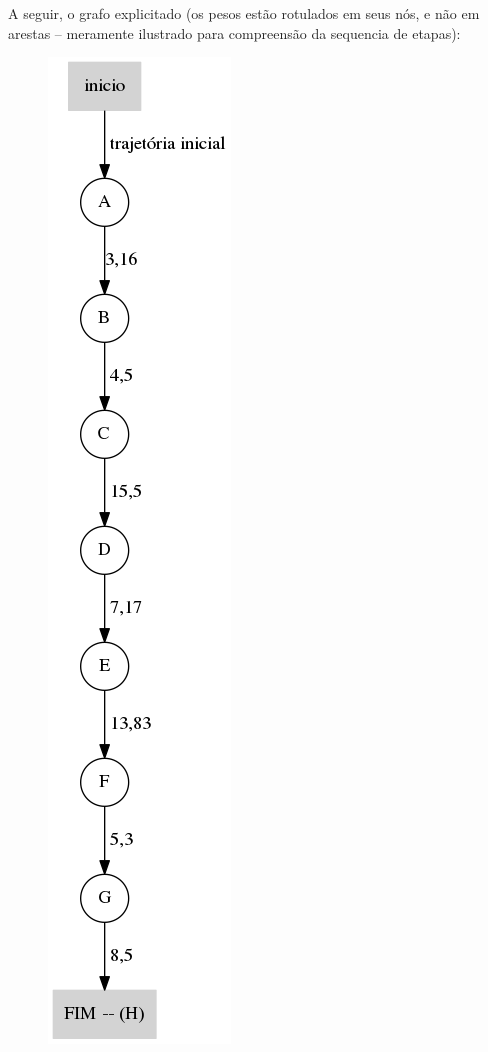 \documentclass[12pt,a4paper]{article}
\begin{document}
		A seguir, o grafo explicitado (os pesos estão rotulados em seus nós, e não em arestas -- meramente ilustrado para compreensão da sequencia de etapas): 
		
		\begin{figure}[!ht]
			\centering
			\includegraphics[scale=0.5]{004.png}
		\end{figure}
		
\end{document}
